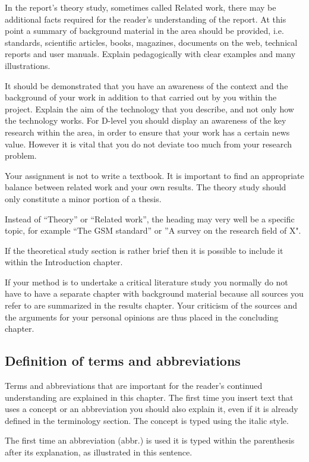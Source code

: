 \iffalse
In the report's theory study, sometimes called Related work, there may be additional facts required for the reader's understanding of the report. At this point a summary of background material in the area should be provided, i.e. standards, scientific articles, books, magazines, documents on the web, technical reports and user manuals. Explain pedagogically with clear examples and many illustrations.

It should be demonstrated that you have an awareness of the context and the background of your work in addition to that carried out by you within the project. Explain the aim of the technology that you describe, and not only how the technology works. For D-level you should display an awareness of the key research within the area, in order to ensure that your work has a certain news value. However it is vital that you do not deviate too much from your research problem.

Your assignment is not to write a textbook. It is important to find an appropriate balance between related work and your own results. The theory study should only constitute a minor portion of a thesis.

Instead of “Theory” or “Related work”, the heading may very well be a specific topic, for example “The GSM standard” or ”A survey on the research field of X".

If the theoretical study section is rather brief then it is possible to include it within the Introduction chapter.

If your method is to undertake a critical literature study you normally do not have to have a separate chapter with background material because all sources you refer to are summarized in the results chapter. Your criticism of the sources and the arguments for your personal opinions are thus placed in the concluding chapter.

\subsection{Definition of terms and abbreviations}
\label{ch:theory:definitions}
Terms and abbreviations that are important for the reader's continued understanding are explained in this chapter. The first time you insert text that uses a concept or an abbreviation you should also explain it, even if it is already defined in the terminology section. The concept is typed using the italic style.

The first time an abbreviation (abbr.) is used it is typed within the parenthesis after its explanation, as illustrated in this sentence.

